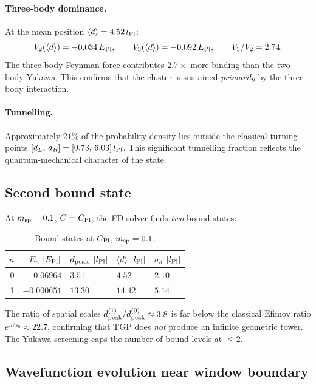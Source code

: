 \paragraph{Three-body dominance.}
At the mean position $\langle d\rangle=4.52\,l_{\rm Pl}$:
\begin{equation}
  V_2(\langle d\rangle) = -0.034\,E_{\rm Pl},\qquad
  V_3(\langle d\rangle) = -0.092\,E_{\rm Pl},\qquad
  V_3/V_2 = 2.74.
\end{equation}
The three-body Feynman force contributes $2.7\times$ more binding than
the two-body Yukawa.  This confirms that the cluster is sustained
\emph{primarily} by the three-body interaction.

\paragraph{Tunnelling.}
Approximately $21\%$ of the probability density lies outside the
classical turning points $[d_L,\,d_R]=[0.73,\,6.03]\,l_{\rm Pl}$.
This significant tunnelling fraction reflects the quantum-mechanical
character of the state.

\subsection{Second bound state}

At $m_{\rm sp}=0.1$, $C=C_{\rm Pl}$, the FD solver finds
\emph{two} bound states:

\begin{table}[h]
\centering
\caption{Bound states at $C_{\rm Pl}$, $m_{\rm sp}=0.1$.}
\label{tab:bound_states}
\begin{tabular}{rrlll}
\hline
$n$ & $E_n$ $[E_{\rm Pl}]$ & $d_{\rm peak}$ $[l_{\rm Pl}]$ &
$\langle d\rangle$ $[l_{\rm Pl}]$ & $\sigma_d$ $[l_{\rm Pl}]$ \\
\hline
0 & $-0.06964$ & $3.51$ & $4.52$ & $2.10$ \\
1 & $-0.000651$ & $13.30$ & $14.42$ & $5.14$ \\
\hline
\end{tabular}
\end{table}

The ratio of spatial scales $d_{\rm peak}^{(1)}/d_{\rm peak}^{(0)}\approx3.8$
is far below the classical Efimov ratio $e^{\pi/s_0}\approx22.7$,
confirming that TGP does \emph{not} produce an infinite geometric tower.
The Yukawa screening caps the number of bound levels at $\leq2$.

\subsection{Wavefunction evolution near window boundary}

